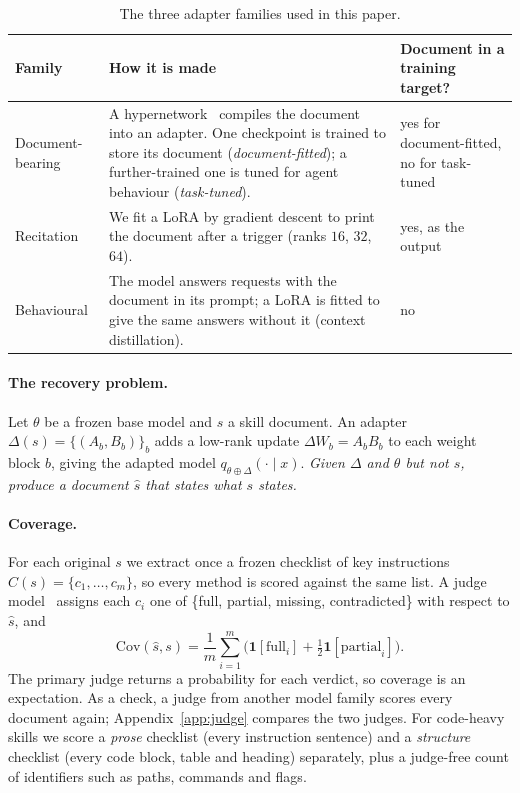 \documentclass[11pt]{article}
\begin{document}
\begin{table}[!htb]
\centering
\caption{The three adapter families used in this paper.}
\label{tab:families}
\small
\setlength{\tabcolsep}{4pt}
\begin{tabular}{>{\raggedright\arraybackslash}p{2.4cm}>{\raggedright\arraybackslash}p{7.6cm}>{\raggedright\arraybackslash}p{3.2cm}}
\toprule
Family & How it is made & Document in a training target?\\
\midrule
Document-bearing & A hypernetwork~\cite{latentskill} compiles the document into an adapter. One checkpoint is trained to store its
document (\emph{document-fitted}); a further-trained one is tuned for agent behaviour (\emph{task-tuned}). & yes for document-fitted, no for task-tuned\\
Recitation & We fit a LoRA by gradient descent to print the document after a trigger (ranks $16$, $32$, $64$). & yes, as the output\\
Behavioural & The model answers requests with the document in its prompt; a LoRA is fitted to give the same answers without it (context distillation). & no\\
\bottomrule
\end{tabular}
\end{table}

\paragraph{The recovery problem.} Let $\theta$ be a frozen base model and $s$ a skill document. An adapter $\Delta(s)=\{(A_b,B_b)\}_b$ adds a
low-rank update $\Delta W_b=A_bB_b$ to each weight block $b$, giving the adapted model $q_{\theta\oplus\Delta}(\cdot\mid x)$. \emph{Given $\Delta$
and $\theta$ but not $s$, produce a document $\hat s$ that states what $s$ states.}

\paragraph{Coverage.} For each original $s$ we extract once a frozen checklist of key instructions $C(s)=\{c_1,\dots,c_m\}$, so every method is
scored against the same list. A judge model~\cite{mtbench} assigns each $c_i$ one of \{full, partial, missing, contradicted\} with respect to $\hat s$, and
\[
\mathrm{Cov}(\hat s,s)=\frac1m\sum_{i=1}^{m}\Big(\mathbf 1[\text{full}_i]+\tfrac12\mathbf 1[\text{partial}_i]\Big).
\]
The primary judge returns a probability for each verdict, so coverage is an expectation. As a check, a judge from another model family scores every document again; Appendix~\ref{app:judge} compares the two judges. For code-heavy skills we score a \emph{prose} checklist (every instruction sentence) and a \emph{structure}
checklist (every code block, table and heading) separately, plus a judge-free count of identifiers such as paths, commands and flags.
\end{document}
